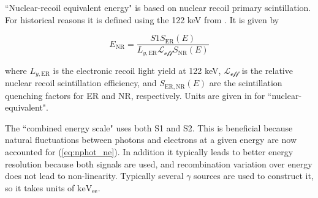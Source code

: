 ``Nuclear-recoil equivalent energy" is based on nuclear recoil primary scintillation.  For historical reasons it is defined using the
122 keV \gammaray from .  It is given by

\begin{equation}
E_{\mathrm{NR}} = \frac{S1 S_{\mathrm{ER}}(E)}{L_{y,\mathrm{ER}} \mathcal{L}_{\mathcal{eff}} S_{\mathrm{NR}}(E)}
\end{equation}

\noindent where $L_{y,\mathrm{ER}}$ is the electronic recoil light yield at 122 keV, $\mathcal{L}_{\mathcal{eff}}$ is the relative nuclear
recoil
scintillation efficiency, and $S_{\mathrm{ER,NR}}(E)$ are the scintillation quenching factors for ER and NR, respectively.  Units are
given in \kevnr for ``nuclear-equivalent".

The ``combined energy scale" uses both S1 and S2.  This is beneficial because natural fluctuations between photons and electrons at a
given energy are now accounted for (\eqref{eq:nphot_ne}).  In addition it typically leads to better energy resolution because both signals
are used, and recombination variation over energy does not lead to non-linearity.  Typically several $\gamma$ sources are used to
construct it, so it takes units of $\mathrm{keV_{ee}}$.
































